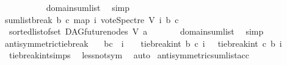 \begin{isabellebody}
\ \ \ \ {\isasymin}\ {\isacharbraceleft}{\kern0pt}{\isacharminus}{\kern0pt}\ {}{\isacharcomma}{\kern0pt}\ {}{\isacharcomma}{\kern0pt}\ {}{\isacharbraceright}{\kern0pt}{\isachardoublequoteclose}\ \isamarkupfalse%
\ domain{\isacharunderscore}{\kern0pt}sumlist\ \isamarkupfalse%
\ simp\ \isanewline
\ \ \isamarkupfalse%
\ {\isachardoublequoteopen}sumlist{\isacharunderscore}{\kern0pt}break\ b\ c\ {\isacharparenleft}{\kern0pt}map\ {\isacharparenleft}{\kern0pt}{\isasymlambda}i{\isachardot}{\kern0pt}\ vote{\isacharunderscore}{\kern0pt}Spectre\ V\ i\ b\ c{\isacharparenright}{\kern0pt}\isanewline
\ \ {\isacharparenleft}{\kern0pt}sorted{\isacharunderscore}{\kern0pt}list{\isacharunderscore}{\kern0pt}of{\isacharunderscore}{\kern0pt}set\ {\isacharparenleft}{\kern0pt}DAG{\isachardot}{\kern0pt}future{\isacharunderscore}{\kern0pt}nodes\ V\ a{\isacharparenright}{\kern0pt}{\isacharparenright}{\kern0pt}{\isacharparenright}{\kern0pt}\ {\isasymin}\ {\isacharbraceleft}{\kern0pt}{\isacharminus}{\kern0pt}\ {}{\isacharcomma}{\kern0pt}\ {}{\isacharcomma}{\kern0pt}\ {}{\isacharbraceright}{\kern0pt}{\isachardoublequoteclose}\ \isamarkupfalse%
\ domain{\isacharunderscore}{\kern0pt}sumlist\ \isamarkupfalse%
\ simp\ \isanewline
{}\isamarkupfalse%
%
\endisatagproof
{\isafoldproof}%
%
\isadelimproof
\isanewline
%
\endisadelimproof
\isanewline
\isanewline
{}\isamarkupfalse%
\ antisymmetric{\isacharunderscore}{\kern0pt}tie{\isacharunderscore}{\kern0pt}break{\isacharcolon}{\kern0pt}\isanewline
\ \ \ {\isachardoublequoteopen}b{\isasymnoteq}c\ {\isasymand}\ i\ {\isacharequal}{\kern0pt}\ {}\ {\isasymLongrightarrow}\ tie{\isacharunderscore}{\kern0pt}break{\isacharunderscore}{\kern0pt}int\ b\ c\ i\ {\isacharequal}{\kern0pt}\ {\isacharminus}{\kern0pt}\ tie{\isacharunderscore}{\kern0pt}break{\isacharunderscore}{\kern0pt}int\ c\ b\ i{\isachardoublequoteclose}\isanewline
%
\isadelimproof
\ \ %
\endisadelimproof
%
\isatagproof
{}\isamarkupfalse%
\ \ tie{\isacharunderscore}{\kern0pt}break{\isacharunderscore}{\kern0pt}int{\isachardot}{\kern0pt}simps\ \isamarkupfalse%
\ less{\isacharunderscore}{\kern0pt}not{\isacharunderscore}{\kern0pt}sym\ \isamarkupfalse%
\ auto%
\endisatagproof
{\isafoldproof}%
%
\isadelimproof
\isanewline
%
\endisadelimproof
\isanewline
\isanewline
{}\isamarkupfalse%
\ antisymmetric{\isacharunderscore}{\kern0pt}sumlist{\isacharunderscore}{\kern0pt}acc{\isacharcolon}{\kern0pt}\isanewline

\end{isabellebody}
